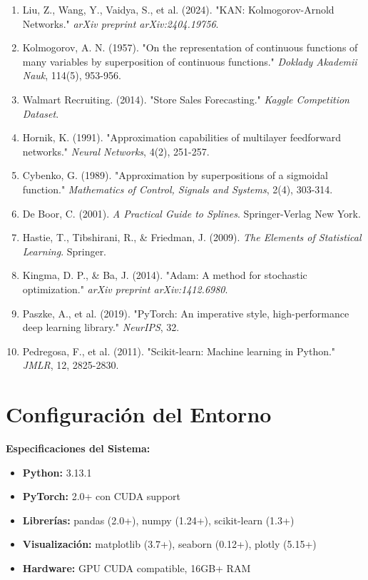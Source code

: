 \documentclass[10pt,twocolumn]{article}
\begin{document}
\begin{enumerate}
    \item Liu, Z., Wang, Y., Vaidya, S., et al. (2024). "KAN: Kolmogorov-Arnold Networks." \emph{arXiv preprint arXiv:2404.19756}.
    
    \item Kolmogorov, A. N. (1957). "On the representation of continuous functions of many variables by superposition of continuous functions." \emph{Doklady Akademii Nauk}, 114(5), 953-956.
    
    \item Walmart Recruiting. (2014). "Store Sales Forecasting." \emph{Kaggle Competition Dataset}. 
    
    \item Hornik, K. (1991). "Approximation capabilities of multilayer feedforward networks." \emph{Neural Networks}, 4(2), 251-257.
    
    \item Cybenko, G. (1989). "Approximation by superpositions of a sigmoidal function." \emph{Mathematics of Control, Signals and Systems}, 2(4), 303-314.
    
    \item De Boor, C. (2001). \emph{A Practical Guide to Splines}. Springer-Verlag New York.
    
    \item Hastie, T., Tibshirani, R., \& Friedman, J. (2009). \emph{The Elements of Statistical Learning}. Springer.
    
    \item Kingma, D. P., \& Ba, J. (2014). "Adam: A method for stochastic optimization." \emph{arXiv preprint arXiv:1412.6980}.
    
    \item Paszke, A., et al. (2019). "PyTorch: An imperative style, high-performance deep learning library." \emph{NeurIPS}, 32.
    
    \item Pedregosa, F., et al. (2011). "Scikit-learn: Machine learning in Python." \emph{JMLR}, 12, 2825-2830.
\end{enumerate}

\appendix

\section{Configuración del Entorno}

\textbf{Especificaciones del Sistema:}
\begin{itemize}
    \item \textbf{Python:} 3.13.1
    \item \textbf{PyTorch:} 2.0+ con CUDA support  
    \item \textbf{Librerías:} pandas (2.0+), numpy (1.24+), scikit-learn (1.3+)
    \item \textbf{Visualización:} matplotlib (3.7+), seaborn (0.12+), plotly (5.15+)
    \item \textbf{Hardware:} GPU CUDA compatible, 16GB+ RAM
\end{itemize}
\end{document}
